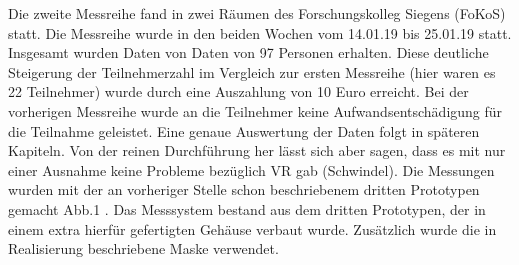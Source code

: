 
Die zweite Messreihe fand in zwei Räumen des Forschungskolleg Siegens (FoKoS) statt. 
Die Messreihe wurde in den beiden Wochen vom  14.01.19 bis 25.01.19 statt. 
Insgesamt wurden Daten von Daten von 97 Personen erhalten. 
Diese deutliche Steigerung der Teilnehmerzahl im Vergleich zur ersten Messreihe (hier waren es 22 Teilnehmer) wurde durch eine Auszahlung von 10 Euro erreicht. 
Bei der vorherigen Messreihe wurde an die Teilnehmer keine Aufwandsentschädigung für die Teilnahme geleistet. 
Eine genaue Auswertung der Daten folgt in späteren Kapiteln. Von der reinen Durchführung her lässt sich aber sagen, dass es mit nur einer Ausnahme keine Probleme bezüglich VR gab (Schwindel).
Die Messungen wurden mit der an vorheriger Stelle schon beschriebenem dritten Prototypen gemacht Abb.1 . Das Messsystem bestand aus dem dritten Prototypen, der in einem extra hierfür gefertigten Gehäuse verbaut wurde. Zusätzlich wurde die in Realisierung beschriebene Maske verwendet. 